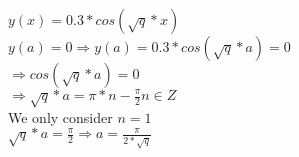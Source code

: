 $y(x)=0.3*cos(\sqrt{q}*x)$ \\
$y(a) = 0 \Rightarrow y(a)=0.3*cos(\sqrt{q}*a) = 0$ \\
$\Rightarrow cos(\sqrt{q}*a) = 0$ \\
$\Rightarrow \sqrt{q}*a = \pi * n - \frac{\pi}{2}      n \in Z $ \\
We only consider $n=1$ \\
$\sqrt{q}*a=\frac{\pi}{2} \Rightarrow a=\frac{\pi}{2*\sqrt{q}}$